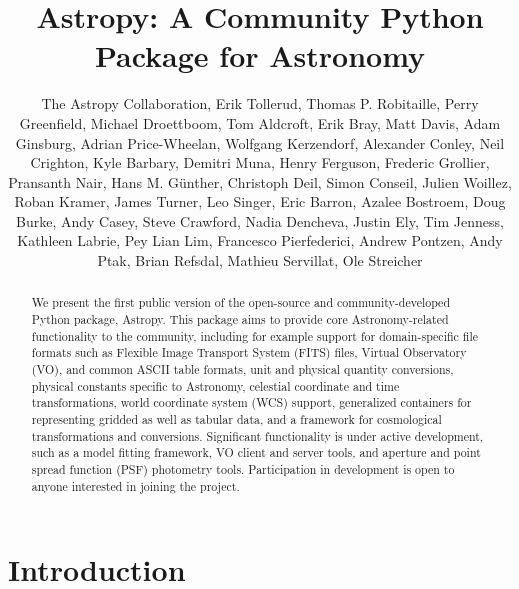 \documentclass[12pt,preprint]{aastex}
\begin{document}
\title{Astropy: A Community Python Package for Astronomy}



\author{
The Astropy Collaboration,
Erik Tollerud,
Thomas P. Robitaille,
Perry Greenfield,
Michael Droettboom,
Tom Aldcroft,
Erik Bray,
Matt Davis,
Adam Ginsburg,
Adrian Price-Wheelan,
Wolfgang Kerzendorf,
Alexander Conley,
Neil Crighton,
Kyle Barbary,
Demitri Muna,
Henry Ferguson,
Frederic Grollier,
Pransanth Nair,
Hans M. G\"unther,
Christoph Deil,
Simon Conseil,
Julien Woillez,
Roban Kramer,
James Turner,
Leo Singer,
Eric Barron,
Azalee Bostroem,
Doug Burke,
Andy Casey,
Steve Crawford,
Nadia Dencheva,
Justin Ely,
Tim Jenness,
Kathleen Labrie,
Pey Lian Lim,
Francesco Pierfederici,
Andrew Pontzen,
Andy Ptak,
Brian Refsdal,
Mathieu Servillat,
Ole Streicher
}

\begin{abstract}
We present the first public version of the open-source and community-developed
Python package, Astropy. This package aims to provide core Astronomy-related
functionality to the community, including for example support for
domain-specific file formats such as Flexible Image Transport System (FITS)
files, Virtual Observatory (VO), and common ASCII table formats, unit and
physical quantity conversions, physical constants specific to Astronomy,
celestial coordinate and time transformations, world coordinate system (WCS)
support, generalized containers for representing gridded as well as tabular
data, and a framework for cosmological transformations and conversions.
Significant functionality is under active development, such as a model fitting
framework, VO client and server tools, and aperture and point spread function
(PSF) photometry tools. Participation in development is open to anyone
interested in joining the project.
\end{abstract}

\tableofcontents


\section{Introduction}
\end{document}
